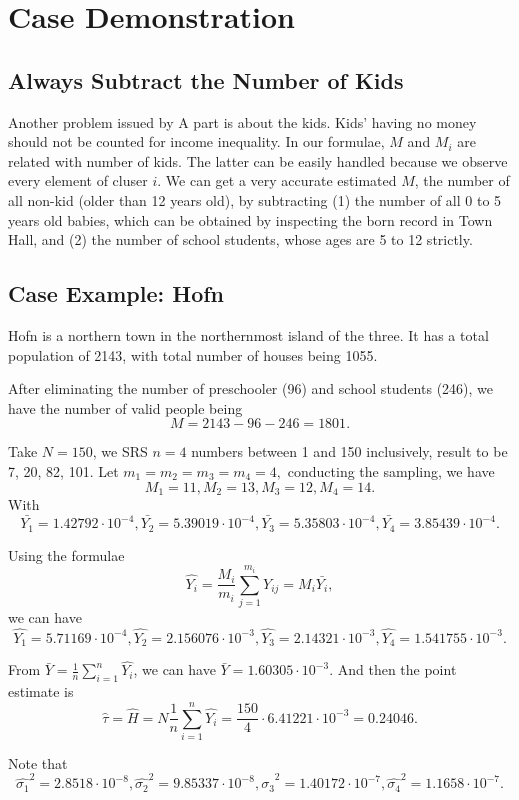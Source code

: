 \documentclass[12pt]{article}%
\begin{document}
\section{Case Demonstration}
\subsection{Always Subtract the Number of Kids}
Another problem issued by A part is about the kids. 
Kids' having no money should not be counted for income inequality. 
In our formulae, $M$ and $M_i$ are related with number of kids. 
The latter can be easily handled because 
we observe every element of cluser $i$.
We can get a very accurate estimated $M$, 
the number of all non-kid (older than 12 years old), 
by subtracting (1) the number of all 0 to 5 years old babies, 
which can be obtained by inspecting the born record in Town Hall, and 
(2) the number of school students, whose ages are 5 to 12 strictly.

\subsection{Case Example: Hofn}
Hofn is a northern town in the northernmost island of the three. 
It has a total population of 2143, with total number of houses being 1055.

After eliminating the number of preschooler (96) and school students (246), 
we have the number of valid people being $$M=2143-96-246=1801.$$ 

Take $N=150$, we SRS $n=4$ numbers between 1 and 150 inclusively, 
result to be 7, 20, 82, 101. Let $m_1 = m_2 = m_3 = m_4 = 4,$
conducting the sampling, we have 
$$M_1 = 11, M_2 = 13, M_3 = 12, M_4=14.$$ 
With 
$$\bar{Y_1}=1.42792\cdot 10^{-4}, \bar{Y_2}=5.39019\cdot 10^{-4}, 
\bar{Y_3}=5.35803\cdot 10^{-4}, \bar{Y_4}=3.85439\cdot 10^{-4}.$$

Using the formulae 
$$\hat{Y_i}=\frac{M_i}{m_i}\sum_{j=1}^{m_i}Y_{ij}=M_i \bar{Y_i},$$ 
we can have 
$$
\hat{Y_1}=5.71169\cdot 10^{-4}, \hat{Y_2}=2.156076\cdot 10^{-3},
\hat{Y_3}=2.14321\cdot 10^{-3}, \hat{Y_4}=1.541755\cdot 10^{-3}.
$$

From $\bar{Y}=\frac{1}{n}\sum_{i=1}^n \hat{Y_i}$, 
we can have $\bar{Y}=1.60305\cdot 10^{-3}$. 
And then the point estimate is 
$$\hat{\tau} = \hat{H} 
= N\frac{1}{n} \sum_{i=1}^n \hat{Y_i} 
= \frac{150}{4}\cdot 6.41221\cdot 10^{-3}=0.24046.$$

Note that 
$$
\hat{\sigma_1}^2=2.8518\cdot 10^{-8}, \hat{\sigma_2}^2=9.85337\cdot 10^{-8},
\hat{\sigma_3}^2=1.40172\cdot 10^{-7}, \hat{\sigma_4}^2=1.1658\cdot 10^{-7}.
$$
\end{document}
